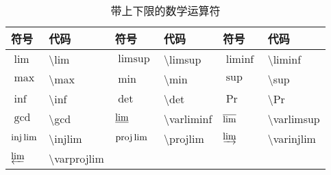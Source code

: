 \documentclass[UTF8,fontset=ubuntu]{ctexart}
\begin{document}
\begin{table}[H]
\begin{minipage}{\textwidth}
\begin{tabular}{l l l l l l}
	\hline
	符号 & 代码 & 符号 & 代码 & 符号 & 代码\\
	\hline
	$\lim$ & \textbackslash lim & $\limsup$ & \textbackslash limsup & $\liminf$ & \textbackslash liminf\\
	$\max$ & \textbackslash max & $\min$ & \textbackslash min & $\sup$ & \textbackslash sup\\
	$\inf$ & \textbackslash inf & $\det$ & \textbackslash det & $\Pr$ & \textbackslash Pr\\
	$\gcd$ & \textbackslash gcd & $\varliminf$ & \textbackslash varliminf & $\varlimsup$ & \textbackslash varlimsup\\
	$\injlim$ & \textbackslash injlim & $\projlim$ & \textbackslash projlim & $\varinjlim$ & \textbackslash varinjlim\\
	$\varprojlim$ & \textbackslash varprojlim\\
	\hline
\end{tabular}
\end{minipage}
\caption{带上下限的数学运算符}
\end{table}
\end{document}

